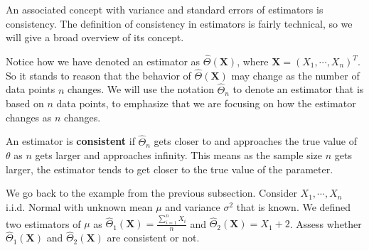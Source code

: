 \documentclass[
]{book}
\begin{document}
An associated concept with variance and standard errors of estimators is consistency. The definition of consistency in estimators is fairly technical, so we will give a broad overview of its concept.

Notice how we have denoted an estimator as \(\hat{\Theta}(\boldsymbol{X})\), where \(\boldsymbol{X} = (X_1, \cdots, X_n)^T\). So it stands to reason that the behavior of \(\hat{\Theta}(\boldsymbol{X})\) may change as the number of data points \(n\) changes. We will use the notation \(\hat{\Theta}_n\) to denote an estimator that is based on \(n\) data points, to emphasize that we are focusing on how the estimator changes as \(n\) changes.

An estimator is \textbf{consistent} if \(\hat{\Theta}_n\) gets closer to and approaches the true value of \(\theta\) as \(n\) gets larger and approaches infinity. This means as the sample size \(n\) gets larger, the estimator tends to get closer to the true value of the parameter.

We go back to the example from the previous subsection. Consider \(X_1, \cdots, X_n\) i.i.d. Normal with unknown mean \(\mu\) and variance \(\sigma^2\) that is known. We defined two estimators of \(\mu\) as \(\hat{\Theta}_1(\boldsymbol{X}) = \frac{\sum_{i=1}^n X_i}{n}\) and \(\hat{\Theta}_2(\boldsymbol{X}) = X_1 + 2\). Assess whether \(\hat{\Theta}_1(\boldsymbol{X})\) and \(\hat{\Theta}_2(\boldsymbol{X})\) are consistent or not.
\end{document}
